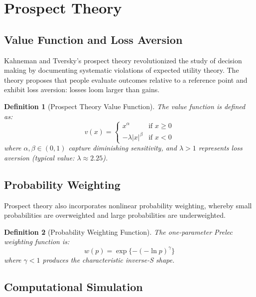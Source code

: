 \documentclass[a4paper, 11pt]{article}
\newtheorem{definition}{Definition}[section]
\begin{document}
\section{Prospect Theory}

\subsection{Value Function and Loss Aversion}

Kahneman and Tversky's prospect theory revolutionized the study of decision making by documenting
systematic violations of expected utility theory. The theory proposes that people evaluate outcomes
relative to a reference point and exhibit loss aversion: losses loom larger than gains.

\begin{definition}[Prospect Theory Value Function]
The value function is defined as:
\begin{equation}
v(x) = \begin{cases}
x^\alpha & \text{if } x \geq 0 \\
-\lambda |x|^\beta & \text{if } x < 0
\end{cases}
\end{equation}
where $\alpha, \beta \in (0,1)$ capture diminishing sensitivity, and $\lambda > 1$ represents
loss aversion (typical value: $\lambda \approx 2.25$).
\end{definition}

\subsection{Probability Weighting}

Prospect theory also incorporates nonlinear probability weighting, whereby small probabilities
are overweighted and large probabilities are underweighted.

\begin{definition}[Probability Weighting Function]
The one-parameter Prelec weighting function is:
\begin{equation}
w(p) = \exp\{-(-\ln p)^\gamma\}
\end{equation}
where $\gamma < 1$ produces the characteristic inverse-S shape.
\end{definition}

\subsection{Computational Simulation}
\end{document}
